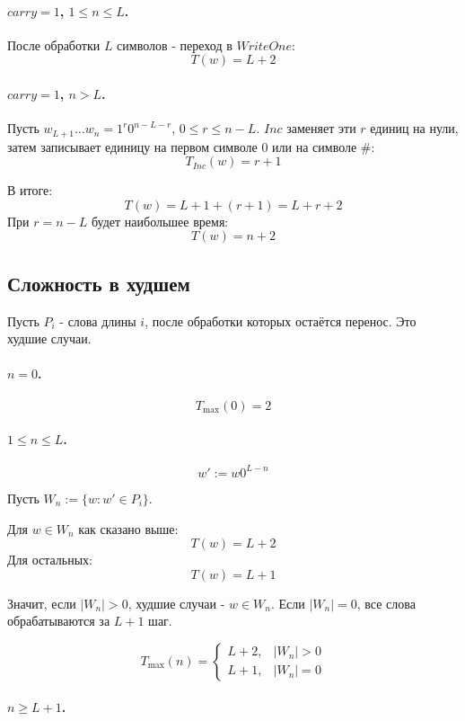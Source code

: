 \documentclass[12pt]{article}
\begin{document}
\paragraph{$carry=1$, $1\leq n\leq L$.}

После обработки $L$ символов - переход в $WriteOne$:
\[
T(w)=L+2
\]

\paragraph{$carry=1$, $n>L$.}

Пусть $w_{L+1}\ldots w_n = 1^r0^{n-L-r}$, $0\leq r\leq n-L$.
$Inc$ заменяет эти $r$ единиц на нули, затем записывает
единицу на первом символе $0$ или на символе $\#$:
\[
T_{Inc}(w)=r+1
\]

В итоге:
\[
T(w)=L+1+(r+1)=L+r+2
\]
При $r=n-L$ будет наибольшее время:
\[
T(w)=n+2
\]

\subsection*{Сложность в худшем}

Пусть $P_i$ - слова длины $i$, после
обработки которых остаётся перенос. Это худшие случаи.

\paragraph{$n=0$.}
\[
T_{\max}(0)=2
\]

\paragraph{$1\leq n\leq L$.}
\[
w':=w0^{L-n}
\]

Пусть $W_n := \{w: w'\in P_i\}$.

Для $w\in W_n$ как сказано выше:
\[
T(w)=L+2
\]
Для остальных:
\[
T(w)=L+1
\]

Значит, если $|W_n|>0$, худшие случаи - $w\in W_n$.
Если $|W_n|=0$, все слова обрабатываются за $L+1$ шаг.

\[
T_{\max}(n)=
\begin{cases}
L+2, & |W_n|>0\\
L+1, & |W_n|=0
\end{cases}
\]

\paragraph{$n\geq L+1$.}
\end{document}
